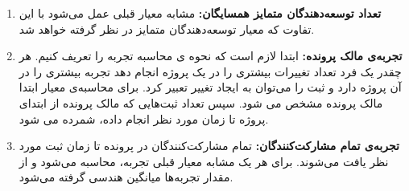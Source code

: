 \begin{enumerate}
	\item
	\textbf{تعداد توسعه‌دهندگان متمایز همسایگان:}
	مشابه معیار قبلی عمل می‌شود با این تفاوت که معیار توسعه‌دهندگان متمایز در نظر گرفته خواهد شد.
	\item
	\textbf{تجربه‌ی مالک پرونده:}
	ابتدا لازم است که نحوه ی محاسبه تجربه را تعریف کنیم. هر چقدر یک فرد تعداد تغییرات بیشتری را در یک پروژه انجام دهد تجربه بیشتری را در آن پروژه دارد و ثبت را می‌توان به ایجاد تغییر تعبیر کرد. برای محاسبه‌ی معیار ابتدا مالک پرونده مشخص می شود. سپس تعداد ثبت‌هایی که مالک پرونده از ابتدای پروژه تا زمان مورد نظر انجام داده، شمرده می شود.
	\item
	\textbf{تجربه‌ی تمام مشارکت‌کنندگان:}
	تمام مشارکت‌کنندگان در پرونده تا زمان ثبت مورد نظر یافت می‌شوند. برای هر یک مشابه معیار قبلی تجربه، محاسبه می‌شود و از مقدار تجربه‌ها میانگین هندسی گرفته می‌شود. 
	
\end{enumerate}
 
